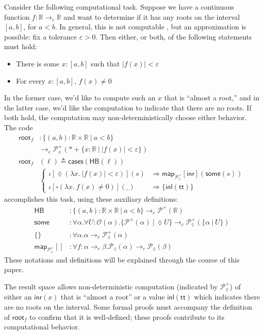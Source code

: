\documentclass[conference]{IEEEtran}
\newcommand{\PLower}{\mathcal{P}_\lozenge}
\newcommand{\Viet}{\mathcal{P}}
\newcommand{\cto}{\to_c}
\newcommand{\R}{\mathbb{R}}
\newcommand{\map}[2]{\mathsf{map}_{#1}[{#2}]}
\newcommand{\fun}[2]{\lambda {#1}.\  {#2}}
\newcommand{\suchthat}{\ |\ }
\newcommand{\One}{\ast}
\newcommand{\Open}[1]{\mathcal{O}({#1})}
\newcommand{\wildcard}{\_}
\newcommand{\oinclf}[1]{\iota[{#1}]}
\newcommand{\oincl}[2]{\oinclf{#1} \left({#2}\right)}
\newcommand{\Branch}{\Rightarrow}
\begin{document}
Consider the following computational task. Suppose we have a continuous function $f : \R \cto \R$ and want to determine if it has any roots on the interval $[a,b]$, for $a < b$. In general, this is not computable \cite{lamcra}, but an approximation is possible: fix a tolerance $\varepsilon > 0$. Then either, or both, of the following statements must hold:
\begin{itemize}
\item There is some $x : [a, b]$ such that $|f(x)| < \varepsilon$
\item For every $x : [a, b]$, $f(x) \neq 0$
\end{itemize}
In the former case, we'd like to compute such an $x$ that is ``almost a root,'' and in the latter case, we'd like the computation to indicate that there are no roots. If both hold, the computation may non-deterministically choose either behavior. The code
\begin{align*}
\mathsf{root}_f &: \{ (a, b) : \R \times \R \suchthat a < b \}
  \\ &\cto \PLower^+(\One + \{ x : \R \suchthat |f(x)| < \varepsilon \})
\\ \mathsf{root}_f&(\ell) \triangleq \mathsf{cases}(\mathsf{HB}(\ell))
\\ &\begin{cases}
\oincl{\lozenge (\fun{x}{|f(x)| < \varepsilon})}{s} 
  &\Branch \map{\PLower^+}{\mathsf{inr}}(\mathsf{some}(s))
\\ \oincl{\square (\fun{x}{f(x) \neq 0})}{\wildcard}
  &\Branch \{ \mathsf{inl}(\mathsf{tt}) \}
\end{cases}
\end{align*}
accomplishes this task, using these auxiliary definitions:
\begin{align*}
\mathsf{HB} &: \{ (a, b) : \R \times \R \suchthat a < b \} \cto \Viet^+(\R)
\\ \mathsf{some} &: \forall \alpha. \forall U : \Open{\alpha}. \{ \Viet^+(\alpha) \suchthat \lozenge U \} \cto \PLower^+(\{ \alpha \suchthat U \})
\\ \{ \} &: \forall \alpha. \alpha \cto \PLower^+(\alpha)
\\ \map{\PLower^+}{} &: \forall f : \alpha \cto \beta. \PLower(\alpha) \cto \PLower(\beta)
\end{align*}
These notations and definitions will be explained through the course of this paper.

The result space allows non-deterministic computation (indicated by $\PLower^+$) of either an $\mathsf{inr}(x)$ that is ``almost a root'' or a value $\mathsf{inl}(\mathsf{tt})$ which indicates there are no roots on the interval. Some formal proofs must accompany the definition of $\mathsf{root}_f$ to confirm that it is well-defined; these proofs contribute to its computational behavior.
 
\end{document}
